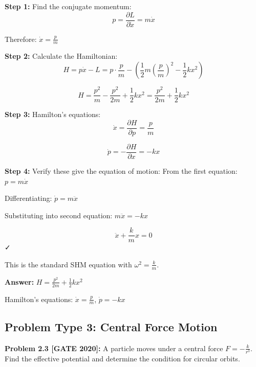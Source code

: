 \documentclass[12pt,a4paper]{article}
\begin{document}
\begin{solution}
\textbf{Step 1:} Find the conjugate momentum:
$$p = \frac{\partial L}{\partial \dot{x}} = m\dot{x}$$

Therefore: $\dot{x} = \frac{p}{m}$

\textbf{Step 2:} Calculate the Hamiltonian:
$$H = p\dot{x} - L = p \cdot \frac{p}{m} - \left(\frac{1}{2}m\left(\frac{p}{m}\right)^2 - \frac{1}{2}kx^2\right)$$

$$H = \frac{p^2}{m} - \frac{p^2}{2m} + \frac{1}{2}kx^2 = \frac{p^2}{2m} + \frac{1}{2}kx^2$$

\textbf{Step 3:} Hamilton's equations:
$$\dot{x} = \frac{\partial H}{\partial p} = \frac{p}{m}$$

$$\dot{p} = -\frac{\partial H}{\partial x} = -kx$$

\textbf{Step 4:} Verify these give the equation of motion:
From the first equation: $p = m\dot{x}$

Differentiating: $\dot{p} = m\ddot{x}$

Substituting into second equation: $m\ddot{x} = -kx$

$$\ddot{x} + \frac{k}{m}x = 0$$ ✓

This is the standard SHM equation with $\omega^2 = \frac{k}{m}$.

\textbf{Answer:} $H = \frac{p^2}{2m} + \frac{1}{2}kx^2$

Hamilton's equations: $\dot{x} = \frac{p}{m}$, $\dot{p} = -kx$
\end{solution}

\subsection{Problem Type 3: Central Force Motion}

\textbf{Problem 2.3 [GATE 2020]:} A particle moves under a central force $F = -\frac{k}{r^3}$. Find the effective potential and determine the condition for circular orbits.
\end{document}
